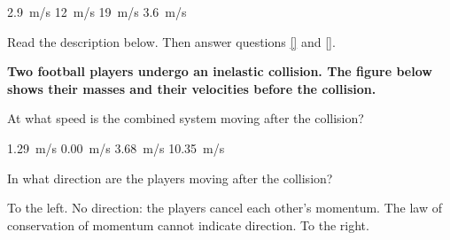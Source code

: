 \documentclass{exam}
\begin{document}
\begin{questions}
\begin{randomizechoices}
\correctchoice \SI{2.9}{m/s}
\choice \SI{12}{m/s}
\choice \SI{19}{m/s}
\choice \SI{3.6}{m/s}
\end{randomizechoices}

\cyanhrule

\begin{EnvUplevel}
Read the description below. Then answer questions \ref{} and \ref{}.

\textbf{Two football players undergo an inelastic collision. The figure below shows their masses and their velocities before the collision.}
\end{EnvUplevel}
 



\begin{center}
\def\xa{1.5}
\def\xb{8.5}
\def\y{3}
\def\rb{6mm}
%
\end{center}

\question
At what speed is the combined system moving after the collision?

\begin{randomizechoices}
\correctchoice \SI{1.29}{m/s} 
\choice \SI{0.00}{m/s}
\choice \SI{3.68}{m/s}
\choice \SI{10.35}{m/s}
\end{randomizechoices}

\question
In what direction are the players moving after the collision?

\begin{randomizechoices}
\choice To the left.
\choice No direction: the players cancel each other's momentum.
\choice The law of conservation of momentum cannot indicate direction.
\correctchoice To the right.
\end{randomizechoices}


\end{questions}
\end{document}
